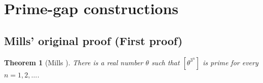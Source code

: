 \documentclass[11pt,reqno]{amsart}
\theoremstyle{redplain}
\newtheorem{theorem}{Theorem}[section]
\numberwithin{equation}{section}
\begin{document}
\section{Prime-gap constructions}
\label{sec:prime-gap}

\subsection{Mills' original proof (First proof)}
\label{sec:mills}

\begin{theorem}[Mills \cite{Mills1947}]
\label{thm:mills}
There is a real number $\theta$ such that $[\theta^{3^n}]$ is prime for
every $n=1,2,\dots$.
\end{theorem}
\end{document}
